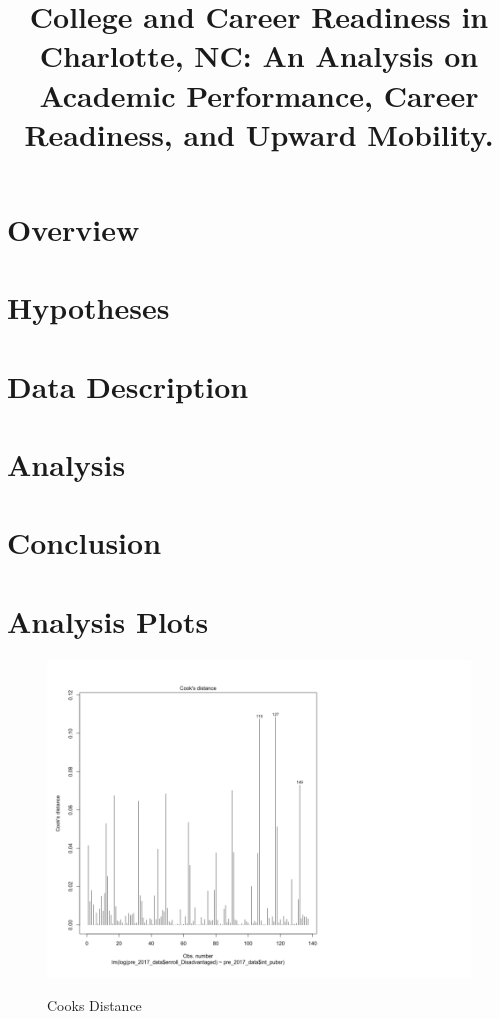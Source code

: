 \documentclass[stu, 12pt, floatsintext]{apa7}
\title{College and Career Readiness in Charlotte, NC: An Analysis on Academic Performance, Career Readiness, and Upward Mobility.}
\begin{document}
\maketitle

\section{Overview}


\section{Hypotheses}


\section{Data Description}


\section{Analysis}


\section{Conclusion}



\printbibliography

\appendix

\section{Analysis Plots}
\begin{figure}
    \caption{Cooks Distance}
    \includegraphics[width=17cm]{CooksDistance.png}
    \label{fig12}
\end{figure}
\end{document}
